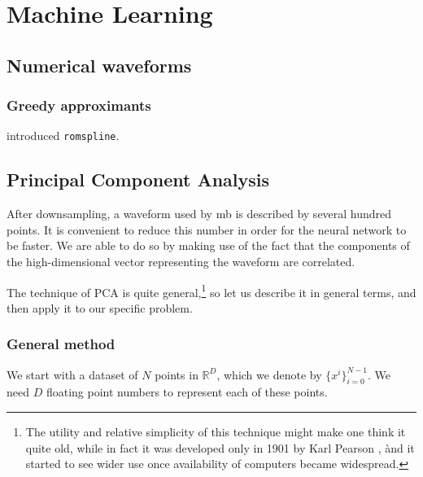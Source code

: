 \documentclass[main.tex]{subfiles}
\begin{document}
\section{Machine Learning}

\subsection{Numerical waveforms}



\subsubsection{Greedy approximants}

\textcite{galleyFastEfficientEvaluation2016} introduced \texttt{romspline}. 

\subsection{Principal Component Analysis} \label{sec:principal-component-analysis}

After downsampling, a waveform used by \acs{mb} is described by several hundred points.
It is convenient to reduce this number in order for the neural network to be faster.
We are able to do so by making use of the fact that the components of the high-dimensional vector representing the waveform are correlated. 

The technique of \ac{PCA} is quite general,\footnote{The utility and relative simplicity of this technique might make one think it quite old, while in fact it was developed only in 1901 by Karl Pearson \cite[]{pearsonLIIILinesPlanes1901,manlyMultivariateStatisticalMethods2017}, ànd it started to see wider use once availability of computers became widespread.} so let us describe it in general terms, and then apply it to our specific problem.

\subsubsection{General method}

We start with a dataset of \(N\) points in \(\mathbb{R}^{D}\), which we denote by \(\{ x^{i}\}_{i=0}^{N-1}\).
We need \(D\) floating point numbers to represent each of these points.
\end{document}

